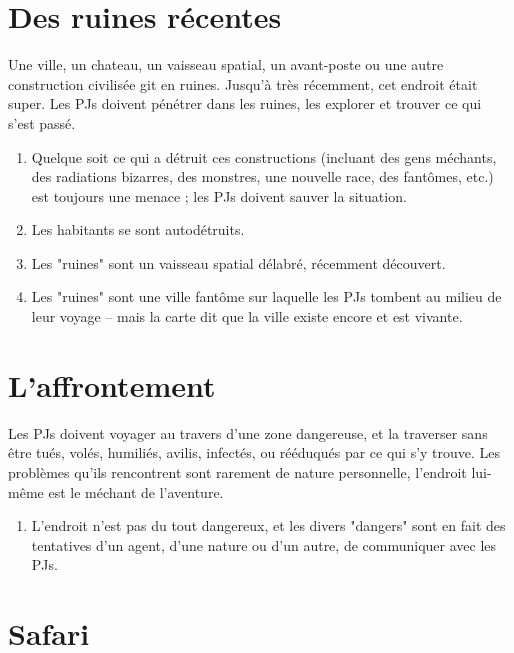 \begin{multicols}{2}
\section{Des ruines récentes}
\hypertarget{ruines}{}


Une ville, un chateau, un vaisseau spatial, un avant-poste ou une autre construction civilisée git en ruines. Jusqu'à très récemment, cet endroit était super. Les PJs doivent pénétrer dans les ruines, les explorer et trouver ce qui s'est passé.

\themes
\begin{enumerate}
\item Quelque soit ce qui a détruit ces constructions (incluant des gens méchants, des radiations bizarres, des monstres, une nouvelle race, des fantômes, etc.) est toujours une menace ; les PJs doivent sauver la situation.
\item Les habitants se sont autodétruits.
\item Les "ruines" sont un vaisseau spatial délabré, récemment découvert.
\item Les "ruines" sont une ville fantôme sur laquelle les PJs tombent au milieu de leur voyage -- mais la carte dit que la ville existe encore et est vivante.
\end{enumerate}

\section{L'affrontement}
\hypertarget{affrontement}{}


Les PJs doivent voyager au travers d'une zone dangereuse, et la traverser sans être tués, volés, humiliés, avilis, infectés, ou rééduqués par ce qui s'y trouve. Les problèmes qu'ils rencontrent sont rarement de nature personnelle, l'endroit lui-même est le méchant de l'aventure.

\themes
\begin{enumerate}
\item L'endroit n'est pas du tout dangereux, et les divers "dangers" sont en fait des tentatives d'un agent, d'une nature ou d'un autre, de communiquer avec les PJs.

\end{enumerate}
\section{Safari}
\hypertarget{safari}{}


\end{multicols}
